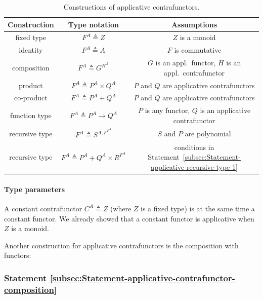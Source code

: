 \begin{table}
\begin{centering}
\begin{tabular}{|c|c|c|}
\hline 
\textbf{\small{}Construction} & \textbf{\small{}Type notation} & \textbf{\small{}Assumptions}\tabularnewline
\hline 
\hline 
{\footnotesize{}fixed type} & {\footnotesize{}$F^{A}\triangleq Z$} & {\footnotesize{}$Z$ is a monoid}\tabularnewline
\hline 
{\footnotesize{}identity} & {\footnotesize{}$F^{A}\triangleq A$} & {\footnotesize{}$F$ is commutative}\tabularnewline
\hline 
{\footnotesize{}composition} & {\footnotesize{}$F^{A}\triangleq G^{H^{A}}$} & {\footnotesize{}$G$ is an appl.~functor, $H$ is an appl.~contrafunctor}\tabularnewline
\hline 
{\footnotesize{}product} & {\footnotesize{}$F^{A}\triangleq P^{A}\times Q^{A}$} & {\footnotesize{}$P$ and $Q$ are applicative contrafunctors}\tabularnewline
\hline 
{\footnotesize{}co-product} & {\footnotesize{}$F^{A}\triangleq P^{A}+Q^{A}$} & {\footnotesize{}$P$ and $Q$ are applicative contrafunctors}\tabularnewline
\hline 
{\footnotesize{}function type} & {\footnotesize{}$F^{A}\triangleq P^{A}\rightarrow Q^{A}$} & {\footnotesize{}$P$ is any functor, $Q$ is an applicative contrafunctor}\tabularnewline
\hline 
{\footnotesize{}recursive type} & {\footnotesize{}$F^{A}\triangleq S^{A,F^{P^{A}}}$} & {\footnotesize{}$S$ and $P$ are polynomial}\tabularnewline
\hline 
{\footnotesize{}recursive type} & {\footnotesize{}$F^{A}\triangleq P^{A}+Q^{A}\times R^{F^{A}}$} & {\footnotesize{}conditions in Statement~\ref{subsec:Statement-applicative-recursive-type-1}}\tabularnewline
\hline 
\end{tabular}
\par\end{centering}
\caption{Constructions of applicative contrafunctors.\label{tab:Constructions-of-applicative-contrafunctors}}
\end{table}


\paragraph{Type parameters}

A constant contrafunctor $C^{A}\triangleq Z$ (where $Z$ is a fixed
type) is at the same time a constant functor. We already showed that
a constant functor is applicative when $Z$ is a monoid. 

Another construction for applicative contrafunctors is the composition
with functors:

\subsubsection{Statement \label{subsec:Statement-applicative-contrafunctor-composition}\ref{subsec:Statement-applicative-contrafunctor-composition}}

